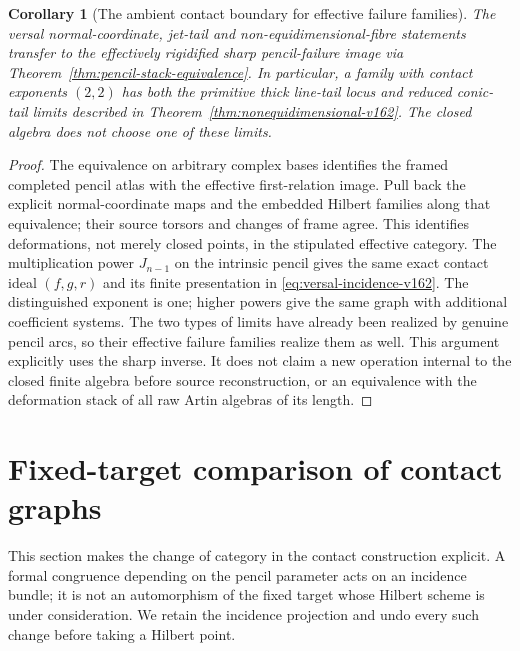 \documentclass[11pt,reqno]{amsart}
\numberwithin{equation}{section}
\newtheorem{corollary}[theorem]{Corollary}
\theoremstyle{definition}\newtheorem{definition}[theorem]{Definition}
\theoremstyle{remark}\newtheorem{remark}[theorem]{Remark}
\begin{document}
\begin{corollary}[The ambient contact boundary for effective failure families]
\label{cor:effective-contact-v162}
The versal normal-coordinate, jet-tail and non-equidimensional-fibre
statements transfer to the effectively rigidified sharp pencil-failure
image via Theorem~\ref{thm:pencil-stack-equivalence}. In particular,
a family with contact exponents $(2,2)$ has both the primitive thick
line-tail locus and reduced conic-tail limits described in
Theorem~\ref{thm:nonequidimensional-v162}. The closed algebra does
not choose one of these limits.
\end{corollary}
\begin{proof}
The equivalence on arbitrary complex bases identifies the framed
completed pencil atlas with the effective first-relation image.
Pull back the explicit normal-coordinate maps and the embedded
Hilbert families along that equivalence; their source torsors and
changes of frame agree. This identifies deformations, not merely
closed points, in the stipulated effective category. The multiplication
power $J_{n-1}$ on the intrinsic pencil gives the same exact contact
ideal $(f,g,r)$ and its finite presentation in
\eqref{eq:versal-incidence-v162}. The distinguished exponent is one;
higher powers give the same graph with additional coefficient systems.
The two types of limits have already been realized by genuine pencil
arcs, so their effective failure families realize them as well.
This argument explicitly uses the sharp inverse. It does not claim
a new operation internal to the closed finite algebra before source
reconstruction, or an equivalence with the deformation stack of all
raw Artin algebras of its length.
\end{proof}

\section{Fixed-target comparison of contact graphs}
\label{sec:embedded-comparison-v163}
This section makes the change of category in the contact construction
explicit. A formal congruence depending on the pencil parameter acts
on an incidence bundle; it is not an automorphism of the fixed target
whose Hilbert scheme is under consideration. We retain the incidence
projection and undo every such change before taking a Hilbert point.
\end{document}
